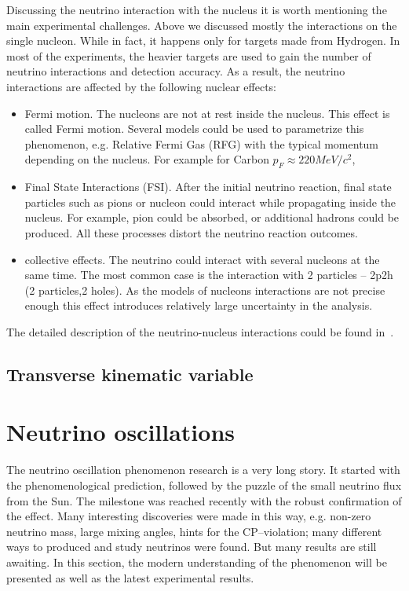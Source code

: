 \documentclass[../main.tex]{subfiles}
\begin{document}
Discussing the neutrino interaction with the nucleus it is worth mentioning the main experimental challenges. Above we discussed mostly the interactions on the single nucleon. While in fact, it happens only for targets made from Hydrogen. In most of the experiments, the heavier targets are used to gain the number of neutrino interactions and detection accuracy. As a result, the neutrino interactions are affected by the following nuclear effects:
\begin{itemize}
  \item Fermi motion. The nucleons are not at rest inside the nucleus. This effect is called Fermi motion. Several models could be used to parametrize this phenomenon, e.g. Relative Fermi Gas (RFG) with the typical momentum depending on the nucleus. For example for Carbon $p_F\approx 220 MeV/c^2$,
  \item Final State Interactions (FSI). After the initial neutrino reaction, final state particles such as pions or nucleon could interact while propagating inside the nucleus. For example, pion could be absorbed, or additional hadrons could be produced. All these processes distort the neutrino reaction outcomes.
  \item collective effects. The neutrino could interact with several nucleons at the same time. The most common case is the interaction with 2 particles -- 2p2h (2 particles,2 holes). As the models of nucleons interactions are not precise enough this effect introduces relatively large uncertainty in the analysis.
\end{itemize}

The detailed description of the neutrino-nucleus interactions could be found in~\cite{Formaggio2012}.

\subsection{Transverse kinematic variable}
\label{sec:intro:pt}


\section{Neutrino oscillations}
\label{sec:intro:osc}
The neutrino oscillation phenomenon research is a very long story. It started with the phenomenological prediction, followed by the puzzle of the small neutrino flux from the Sun. The milestone was reached recently with the robust confirmation of the effect. Many interesting discoveries were made in this way, e.g. non-zero neutrino mass, large mixing angles, hints for the CP--violation; many different ways to produced and study neutrinos were found. But many results are still awaiting. In this section, the modern understanding of the phenomenon will be presented as well as the latest experimental results.
\end{document}
